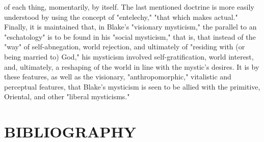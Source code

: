 of each thing, momentarily, by itself. The last mentioned doctrine is more easily understood by using the concept of "entelechy,"
"that which makes actual." Finally, it is maintained that, in Blake's  "visionary mysticism," the parallel to an "eschatology" is
to be found in his "social mysticism," that is, that instead of the "way" of self-abnegation, world rejection, and ultimately of 
"residing with (or being married to) God," his mysticism involved self-gratification, world interest, and, ultimately, a
reshaping of the world in line with the mystic's desires. It is by these features, as well as the visionary, "anthropomorphic,"
vitalistic and perceptual features, that Blake's mysticism is seen to be allied with the primitive, Oriental, and other "liberal mysticisms."\par

\newpage

\section*{\centering BIBLIOGRAPHY}

{}

